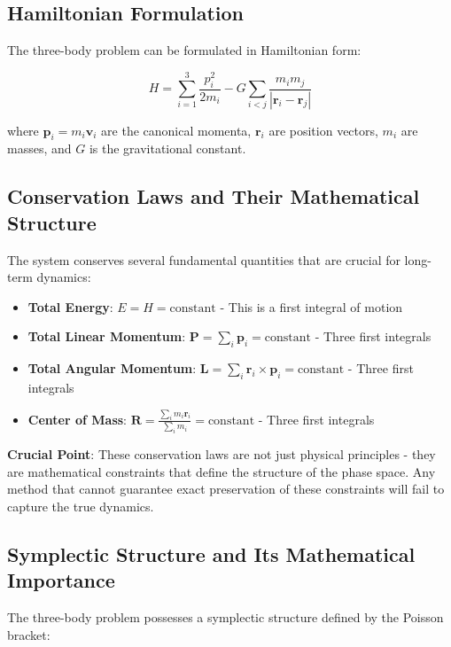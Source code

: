\documentclass[11pt,a4paper]{article}
\begin{document}
\subsection{Hamiltonian Formulation}

The three-body problem can be formulated in Hamiltonian form:

\begin{equation}
H = \sum_{i=1}^3 \frac{p_i^2}{2m_i} - G \sum_{i<j} \frac{m_i m_j}{|\mathbf{r}_i - \mathbf{r}_j|}
\end{equation}

where $\mathbf{p}_i = m_i \mathbf{v}_i$ are the canonical momenta, $\mathbf{r}_i$ are position vectors, $m_i$ are masses, and $G$ is the gravitational constant.

\subsection{Conservation Laws and Their Mathematical Structure}

The system conserves several fundamental quantities that are crucial for long-term dynamics:

\begin{itemize}
    \item \textbf{Total Energy}: $E = H = \text{constant}$ - This is a first integral of motion
    \item \textbf{Total Linear Momentum}: $\mathbf{P} = \sum_i \mathbf{p}_i = \text{constant}$ - Three first integrals
    \item \textbf{Total Angular Momentum}: $\mathbf{L} = \sum_i \mathbf{r}_i \times \mathbf{p}_i = \text{constant}$ - Three first integrals
    \item \textbf{Center of Mass}: $\mathbf{R} = \frac{\sum_i m_i \mathbf{r}_i}{\sum_i m_i} = \text{constant}$ - Three first integrals
\end{itemize}

\textbf{Crucial Point}: These conservation laws are not just physical principles - they are mathematical constraints that define the structure of the phase space. Any method that cannot guarantee exact preservation of these constraints will fail to capture the true dynamics.

\subsection{Symplectic Structure and Its Mathematical Importance}

The three-body problem possesses a symplectic structure defined by the Poisson bracket:
\end{document}
